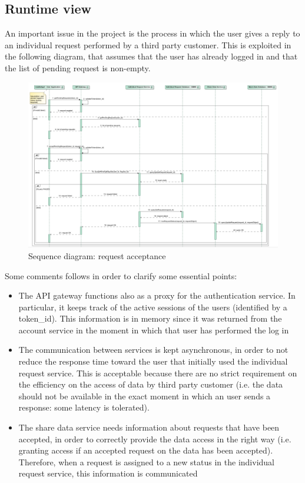 \subsection{Runtime view}
An important issue in the project is the process in which the user gives a reply to an individual request
performed by a third party customer. This is exploited in the following diagram, that assumes that the user
has already logged in and that the list of pending request is non-empty.

\begin{figure}[H]
\includegraphics[width=\linewidth]{Images/requestacceptance.pdf}
\caption{ Sequence diagram: request acceptance }
\label{fig:world2}
\end{figure}

Some comments follows in order to clarify some essential points:
\begin{itemize}
\item The API gateway functions also as a proxy for the authentication service. In particular, it keeps track of the active sessions of the
users (identified by a token\_id). This information is in memory since
it was returned from the account service in the moment in which that user has performed the log in
\item The communication between services is kept asynchronous, in order to not reduce the response time 
toward the user that initially used the individual request service. This is acceptable because there are
no strict requirement on the efficiency on the access of data by third party customer (i.e. the data should
not be available in the exact moment in which an user sends a response: some latency is tolerated). 
\item The share data service needs information about requests that have been accepted, in order to correctly
provide the data access in the right way (i.e. granting access if an accepted request on the data has been 
accepted). Therefore, when a request is assigned to a new status in the individual request service, this information is communicated
\end{itemize}


